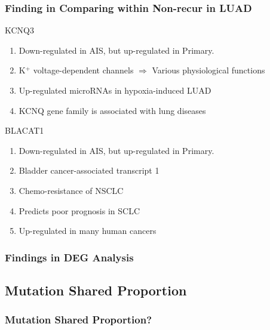 \documentclass{beamer}
\begin{document}
    \begin{frame}[allowframebreaks]
        \frametitle{Finding in Comparing within Non-recur in LUAD}

        \begin{block}{KCNQ3}
            \begin{enumerate}
                \item Down-regulated in AIS, but up-regulated in Primary.
                \item K$^+$ voltage-dependent channels $\Rightarrow$ Various physiological functions \cite{KCNQ3-1, KCNQ3-2, KCNQ3-3}
                \item Up-regulated microRNAs in hypoxia-induced LUAD \cite{KCNQ3-4}
                \item KCNQ gene family is associated with lung diseases \cite{KCNQ3-5}
            \end{enumerate}
        \end{block}

        \begin{block}{BLACAT1}
            \begin{enumerate}
                \item Down-regulated in AIS, but up-regulated in Primary.
                \item Bladder cancer-associated transcript 1
                \item Chemo-resistance of NSCLC \cite{BLACAT1-1}
                \item Predicts poor prognosis in SCLC \cite{BLACAT1-2}
                \item Up-regulated in many human cancers \cite{BLACAT1-3}
            \end{enumerate}
        \end{block}
    \end{frame}

    \begin{frame}
        \frametitle{Findings in DEG Analysis}
    \end{frame}

    \subsection{Mutation Shared Proportion}
    \begin{frame}
        \frametitle{Mutation Shared Proportion?}
    \end{frame}
\end{document}
